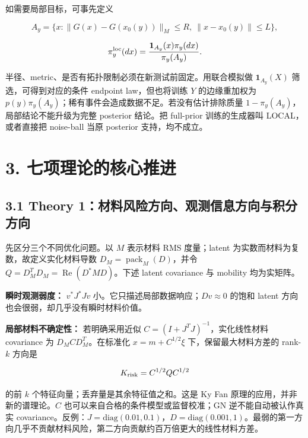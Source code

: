 \documentclass[
  11pt,
  a4paper,
]{article}
\begin{document}
如需要局部目标，可事先定义

\[A_y=\{x:\|G(x)-G(x_0(y))\|_M\le R,\ \|x-x_0(y)\|\le L\},\]

\[\pi_y^{\rm loc}(dx)=\frac{\mathbf1_{A_y}(x)\pi_y(dx)}{\pi_y(A_y)}.\]

半径、metric、是否有拓扑限制必须在新测试前固定。用联合模拟做
\(\mathbf1_{A_y}(X)\) 筛选，可得到对应的条件 endpoint law，但也将训练
\(Y\) 的边缘重加权为
\(p(y)\pi_y(A_y)\)；稀有事件会造成数据不足。若没有估计排除质量
\(1-\pi_y(A_y)\)，局部结论不能升级为完整 posterior 结论。把 full-prior
训练的生成器叫 LOCAL，或者直接把 noise-ball 当原 posterior
支持，均不成立。

\hypertarget{ux4e03ux9879ux7406ux8bbaux7684ux6838ux5fc3ux63a8ux8fdb}{%
\section{3.
七项理论的核心推进}\label{ux4e03ux9879ux7406ux8bbaux7684ux6838ux5fc3ux63a8ux8fdb}}

\hypertarget{theory-1ux6750ux6599ux98ceux9669ux65b9ux5411ux89c2ux6d4bux4fe1ux606fux65b9ux5411ux4e0eux79efux5206ux65b9ux5411}{%
\subsection{3.1 Theory
1：材料风险方向、观测信息方向与积分方向}\label{theory-1ux6750ux6599ux98ceux9669ux65b9ux5411ux89c2ux6d4bux4fe1ux606fux65b9ux5411ux4e0eux79efux5206ux65b9ux5411}}

先区分三个不同优化问题。以 \(M\) 表示材料 RMS 度量；latent
为实数而材料为复数，故定义实化材料导数
\(D_M=\operatorname{pack}_M(D)\)，并令
\(Q=D_M^TD_M=\operatorname{Re}(D^*MD)\)。下述 latent covariance 与
mobility 均为实矩阵。

\textbf{瞬时观测弱度：} \(v^*J^*Jv\)
小。它只描述局部数据响应；\(Dv\approx0\) 的饱和 latent
方向也会很弱，却几乎没有瞬时材料价值。

\textbf{局部材料不确定性：} 若明确采用近似
\(C=(I+J^TJ)^{-1}\)，实化线性材料 covariance 为 \(D_MCD_M^T\)。在标准化
\(x=m+C^{1/2}\xi\) 下，保留最大材料方差的 rank-\(k\) 方向是

\[K_{\rm risk}=C^{1/2}QC^{1/2}\]

的前 \(k\) 个特征向量；丢弃量是其余特征值之和。这是 Ky Fan
原理的应用，并非新的谱理论。\(C\) 也可以来自合格的条件模型或监督校准；GN
逆不能自动被认作真实
covariance。反例：\(J=\mathrm{diag}(0.01,0.1)\)，\(D=\mathrm{diag}(0.001,1)\)。最弱的第一方向几乎不贡献材料风险，第二方向贡献约百万倍更大的线性材料方差。
\end{document}
